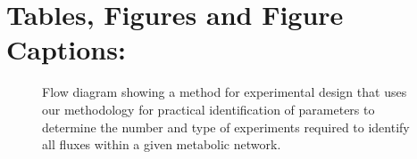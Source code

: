\documentclass[10pt]{article}
\begin{document}
	
	\printbibliography
	
	\clearpage
	\section{Tables, Figures and Figure Captions:}
	
	
	\begin{figure}[!tbhp]
		\caption{Flow diagram showing a method for experimental design that uses our methodology for practical identification of parameters to determine the number and type of experiments required to identify all fluxes within a given metabolic network.}\label{fig:ident-design}
	\end{figure}
\end{document}

